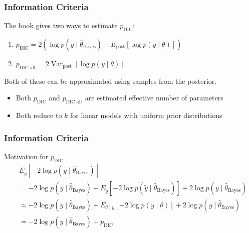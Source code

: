 \documentclass{beamer}
\begin{document}
\begin{frame}
\frametitle{Information Criteria}

The book gives two ways to estimate $p_{\text{DIC}}$:

\begin{enumerate}
\item $p_{\text{DIC}} = 2\left(\log p(y \mid \hat{\theta}_{\text{Bayes}}) - E_{\text{post}}\left[ \log p(y \mid \theta) \right] \right)$
\item $p_{\text{DIC alt}} = 2 \operatorname{Var}_{\text{post}}\left[ \log p(y \mid \theta) \right]$
\end{enumerate}

Both of these can be approximated using samples from the posterior.

\begin{itemize}
\item Both $p_{\text{DIC}}$ and $p_{\text{DIC alt}}$ are estimated
  effective number of parameters
\item Both reduce to $k$ for linear models with uniform prior distributions
\end{itemize}
\end{frame}

\begin{frame}
\frametitle{Information Criteria}

Motivation for $p_{\text{DIC}}$
\begin{align*}
&E_{\tilde{y}}\left[-2  \log p(\tilde{y} \mid \hat{\theta}_{\text{Bayes}})  \right] \\
&= - 2\log p(y \mid \hat{\theta}_{\text{Bayes}}) + E_{\tilde{y}}\left[  -2\log p(\tilde{y} \mid \hat{\theta}_{\text{Bayes}})  \right] + 2\log p(y \mid \hat{\theta}_{\text{Bayes}})\\
&\approx - 2\log p(y \mid \hat{\theta}_{\text{Bayes}}) +  E_{\theta \mid y}\left[ - 2 \log p(y \mid \theta) \right] + 2 \log p(y \mid \hat{\theta}_{\text{Bayes}} ) \\
&= - 2\log p(y \mid \hat{\theta}_{\text{Bayes}}) + p_{\text{DIC}}
\end{align*}


\end{frame}
\end{document}
